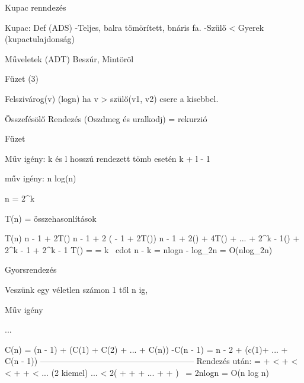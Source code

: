 Kupac renndezés

Kupac:
Def (ADS)
-Teljes, balra tömörített, bnáris fa.
-Szülő < Gyerek (kupactulajdonság)

Műveletek (ADT)
Beszúr, Mintöröl

Füzet (3)

Felszivárog(v)  (logn)
{
  ha v > szülő(v1, v2)
  {
    csere a kisebbel.
  }
}


Összefésölő Rendezés
(Oszdmeg és uralkodj) = rekurzió

Füzet

Műv igény:
k és l hosszú rendezett tömb esetén k + l - 1

műv igény: n \cdot log(n)

n = 2^k

T(n) = összehasonlítások

T(n) \leq n - 1 + 2T() \leq n - 1 + 2 ( - 1 + 2T()) \leq
\leq n - 1 + 2() + 4T() + ... + 2^{k - 1}() + 2^{k - 1} + 2^{k - 1} T() =
= k \ cdot n - k = nlogn - log_2n = O(nlog_2n)


Gyorsrendezés

Veszünk egy véletlen számon 1 től n ig,



Műv igény

...

   C(n) = (n - 1) + (C(1) + C(2) + ... + C(n))
  -C(n - 1) = n - 2 + (c(1)+ ... + C(n - 1))
  --------------------------------------------------------
  Rendezés után:
   =  +  <  +  <
  <  +  +  < ...
  (2 kiemel)
  ... < 2( +  +  + ... +  + ) ~= 2nlogn = O(n log n)




   







